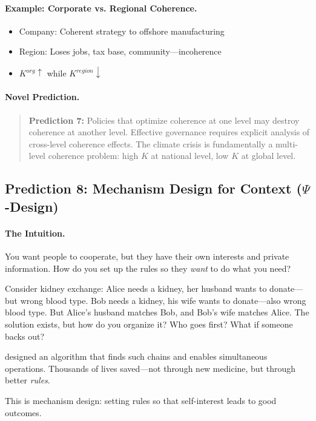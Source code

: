 \paragraph{Example: Corporate vs. Regional Coherence.}
\begin{itemize}
  \item Company: Coherent strategy to offshore manufacturing
  \item Region: Loses jobs, tax base, community---incoherence
  \item $K^{org} \uparrow$ while $K^{region} \downarrow$
\end{itemize}

\paragraph{Novel Prediction.}
\begin{quote}
\textbf{Prediction 7:} Policies that optimize coherence at one level
may destroy coherence at another level. Effective governance requires
explicit analysis of cross-level coherence effects.
The climate crisis \citep{weitzman2009} is fundamentally a multi-level coherence problem:
high $K$ at national level, low $K$ at global level.
\end{quote}

\subsection{Prediction 8: Mechanism Design for Context ($\Psi$-Design)}

\paragraph{The Intuition.}
You want people to cooperate, but they have their own interests and private information.
How do you set up the rules so they \emph{want} to do what you need?

Consider kidney exchange: Alice needs a kidney, her husband wants to donate---but wrong blood type.
Bob needs a kidney, his wife wants to donate---also wrong blood type.
But Alice's husband matches Bob, and Bob's wife matches Alice.
The solution exists, but how do you organize it? Who goes first? What if someone backs out?

\citet{roth2002} designed an algorithm that finds such chains and enables simultaneous operations.
Thousands of lives saved---not through new medicine, but through better \emph{rules}.

This is mechanism design: setting rules so that self-interest leads to good outcomes.

